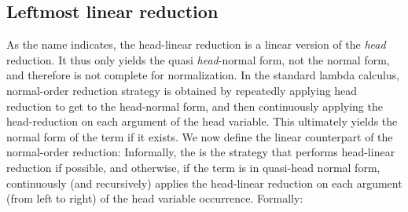 \documentclass{elsarticle}
\theoremstyle{plain}
\theoremstyle{definition}
\begin{document}
\subsection{Leftmost linear reduction}

As the name indicates, the head-linear reduction is a linear version of the
\emph{head} reduction. It thus only yields the quasi \emph{head}-normal form,
not the normal form, and therefore is not complete for normalization.
In the standard lambda calculus, normal-order reduction strategy is obtained by repeatedly applying head reduction to get to the head-normal form,
 and then continuously applying the head-reduction on each argument of the head variable.
This ultimately yields the normal form of the term if it exists.
We now define the linear counterpart of the normal-order reduction: Informally,
 the  is the strategy that performs
 head-linear reduction if possible, and otherwise, if the term is in quasi-head
  normal form, continuously (and recursively) applies the head-linear reduction
  on each argument (from left to right) of the head variable occurrence.
Formally:
\end{document}
